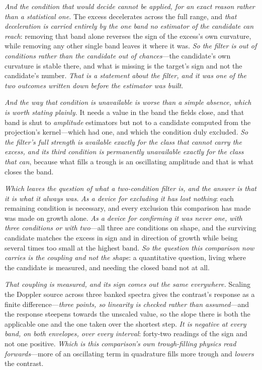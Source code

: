 \documentclass[11pt,a4paper]{article}
\theoremstyle{plain}
\theoremstyle{definition}
\theoremstyle{remark}
\begin{document}
\emph{And the condition that would decide cannot be applied, for an exact reason rather than a statistical
one.} The excess decelerates across the full range, and \emph{that deceleration is carried entirely by the one
band no estimator of the candidate can reach}: removing that band alone reverses the sign of the excess's own
curvature, while removing any other single band leaves it where it was. \emph{So the filter is out of
conditions rather than the candidate out of chances}---the candidate's own curvature is stable there, and what
is missing is the target's sign and not the candidate's number. \emph{That is a statement about the filter, and
it was one of the two outcomes written down before the estimator was built}.

\emph{And the way that condition is unavailable is worse than a simple absence, which is worth stating
plainly.} It needs a value in the band the fields close, and that band is shut to \emph{amplitude}
estimators but not to a candidate computed from the projection's kernel---which had one, and which the
condition duly excluded. \emph{So the filter's full strength is available exactly for the class that cannot
carry the excess, and its third condition is permanently unavailable exactly for the class that can},
because what fills a trough is an oscillating amplitude and that is what closes the band.

\emph{Which leaves the question of what a two-condition filter is, and the answer is that it is what it
always was.} \emph{As a device for excluding it has lost nothing}: each remaining condition is necessary,
and every exclusion this comparison has made was made on growth alone. \emph{As a device for confirming it
was never one, with three conditions or with two}---all three are conditions on shape, and the surviving
candidate matches the excess in sign and in direction of growth while being several times too small at the
highest band. \emph{So the question this comparison now carries is the coupling and not the shape}: a
quantitative question, living where the candidate is measured, and needing the closed band not at all.

\emph{That coupling is measured, and its sign comes out the same everywhere.} Scaling the Doppler source
across three banked spectra gives the contrast's response as a finite difference---\emph{three points, so
linearity is checked rather than assumed}---and the response steepens towards the unscaled value, so the
slope there is both the applicable one and the one taken over the shortest step. \emph{It is negative at
every band, on both envelopes, over every interval}: forty-two readings of the sign and not one positive.
\emph{Which is this comparison's own trough-filling physics read forwards}---more of an oscillating term in
quadrature fills more trough and \emph{lowers} the contrast.
\end{document}
